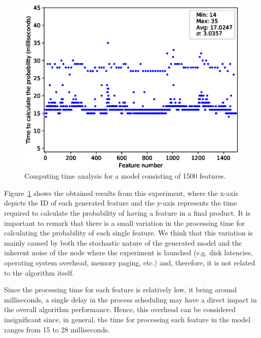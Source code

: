 \begin{figure}[h]
        \centering
        \linefigure
        \includegraphics[width=0.8\hsize,angle=0]{plot_probs_times.eps}
        \linefigure
        \caption{Computing time analysis for a model consisting of 1500 features.}\label{fig:plot:probs:times}
\end{figure}

Figure~\ref{fig:plot:probs:times} shows the obtained
results from this experiment, where the x-axis depicts
the ID of each generated feature and the y-axis represents
the time required to calculate the probability of having a feature in a final product.
It is important to remark that there is a small variation in the processing time for
calculating the probability of each single feature. We think that this variation is
mainly caused by both the stochastic nature of the generated model and the 
inherent noise of the node where the experiment is launched (e.g. disk latencies, operating
system overhead, memory paging, etc.) and, therefore, it is not related to the algorithm itself.

Since the processing time for each feature is relatively low, it being around milliseconds, a single delay in
the process scheduling may have a direct impact in the overall algorithm performance. Hence, this overhead
can be considered insignificant since, in general, the time for processing each feature in the model ranges
from 15 to 28 milliseconds.

